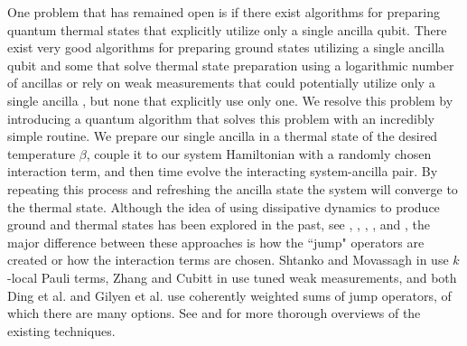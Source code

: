 \documentclass{article}
\begin{document}
One problem that has remained open is if there exist algorithms for preparing quantum thermal states that explicitly utilize only a single ancilla qubit. There exist very good algorithms for preparing ground states utilizing a single ancilla qubit \cite{ding2024single} and some that solve thermal state preparation using a logarithmic number of ancillas \cite{chen_fast_2022} or rely on weak measurements that could potentially utilize only a single ancilla \cite{zhang2023dissipative}, but none that explicitly use only one. We resolve this problem by introducing a quantum algorithm that solves this problem with an incredibly simple routine. We prepare our single ancilla in a thermal state of the desired temperature $\beta$, couple it to our system Hamiltonian with a randomly chosen interaction term, and then time evolve the interacting system-ancilla pair. By repeating this process and refreshing the ancilla state the system will converge to the thermal state. Although the idea of using dissipative dynamics to produce ground and thermal states has been explored in the past, see \cite{shtanko2023preparingthermalstatesnoiseless}, \cite{cubitt2023dissipativegroundstatepreparation}, \cite{zhang2023dissipative}, \cite{ding2024single}, and \cite{gilyen2024quantumgeneralizationsglaubermetropolis}, the major difference between these approaches is how the ``jump" operators are created or how the interaction terms are chosen. Shtanko and Movassagh in \cite{shtanko2023preparingthermalstatesnoiseless} use $k$-local Pauli terms, Zhang and Cubitt in \cite{zhang2023dissipative} use tuned weak measurements, and both Ding et al. \cite{ding2024single} and Gilyen et al. \cite{gilyen2024quantumgeneralizationsglaubermetropolis} use coherently weighted sums of jump operators, of which there are many options. See \cite{dalzell2023quantumalgorithmssurveyapplications} and \cite{chen2023quantumthermalstatepreparation} for more thorough overviews of the existing techniques.
\end{document}
